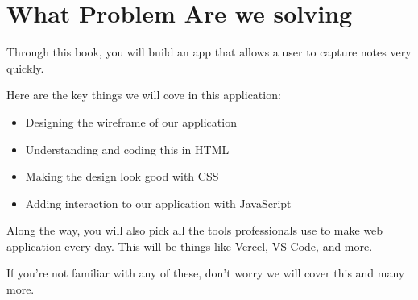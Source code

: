 \documentclass[11pt]{article}
\begin{document}
    \section{What Problem Are we solving}\label{sec:what-problem-are-we-solving}
    Through this book, you will build an app that allows a user to capture notes very quickly.

    Here are the key things we will cove in this application:
    \begin{itemize}
        \item Designing the wireframe of our application
        \item Understanding and coding this in HTML
        \item Making the design look good with CSS
        \item Adding interaction to our application with JavaScript
    \end{itemize}

    Along the way, you will also pick all the tools professionals use to make web application every day.
    This will be things like Vercel, VS Code, and more.

    If you're not familiar with any of these, don't worry we will cover this and many more.
\end{document}
